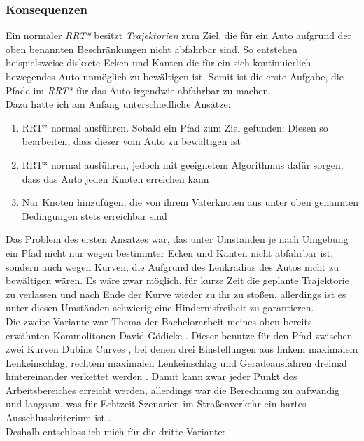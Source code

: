 \subsubsection{Konsequenzen}
Ein normaler \textit{RRT*} besitzt \textit{Trajektorien} zum Ziel, die für ein Auto aufgrund der oben benannten Beschränkungen nicht abfahrbar sind. So entstehen beispielsweise diskrete Ecken und Kanten die für ein sich kontinuierlich bewegendes Auto unmöglich zu bewältigen ist. Somit ist die erste Aufgabe, die Pfade im \textit{RRT*} für das Auto irgendwie abfahrbar zu machen.\\
Dazu hatte ich am Anfang unterschiedliche Ansätze:
\begin{enumerate}
\item RRT* normal ausführen. Sobald ein Pfad zum Ziel gefunden: Diesen so bearbeiten, dass dieser vom Auto zu bewältigen ist
\item RRT* normal ausführen, jedoch mit geeignetem Algorithmus dafür sorgen, dass das Auto jeden Knoten erreichen kann
\item Nur Knoten hinzufügen, die von ihrem Vaterknoten aus unter oben genannten Bedingungen stets erreichbar sind
\end{enumerate}
Das Problem des ersten Ansatzes war, das unter Umständen je nach Umgebung ein Pfad nicht nur wegen bestimmter Ecken und Kanten nicht abfahrbar ist, sondern auch wegen Kurven, die Aufgrund des Lenkradius des Autos nicht zu bewältigen wären. Es wäre zwar möglich, für kurze Zeit die geplante Trajektorie zu verlassen und nach Ende der Kurve wieder zu ihr zu stoßen, allerdings ist es unter diesen Umständen schwierig eine Hindernisfreiheit zu garantieren. \\
Die zweite Variante war Thema der Bachelorarbeit meines oben bereits erwähnten Kommolitonen David Gödicke \citep{Goedicke18}. Dieser benutze für den Pfad zwischen zwei Kurven Dubins Curves \citep{Dubin61}, bei denen drei Einstellungen aus linkem maximalem Lenkeinschlag, rechtem maximalen Lenkeinschlag und Geradeausfahren dreimal hintereinander verkettet werden . Damit kann zwar jeder Punkt des Arbeitsbereiches erreicht werden, allerdings war die Berechnung zu aufwändig und langsam, was für Echtzeit Szenarien im Straßenverkehr ein hartes Ausschlusskriterium ist \citep[vergleiche][Kapitel 7]{Goedicke18}. \\
Deshalb entschloss ich mich für die dritte Variante: 

